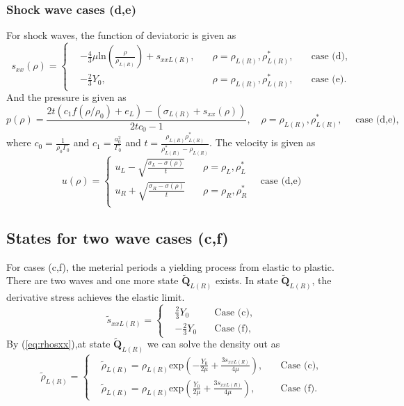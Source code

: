 \documentclass[review]{elsarticle}
\begin{document}
\subsubsection{Shock wave cases (d,e)}
For shock waves, the function of deviatoric is given as 
\begin{equation}
  s_{xx}(\rho) = \left\{\begin{aligned}
	  & -\frac{4}{3}\mu\text{ln}\left(\frac{\rho}{\rho_{L(R)}}\right)+s_{xxL(R)},\quad   &\rho =\rho_{L(R)},\rho_{L(R)}^*,
	\quad  &\text{case (d)},\\
	& -\frac{2}{3}Y_0,   \quad & \rho =\rho_{L(R)},\rho_{L(R)}^*, \quad
 &\text{case (e)}.
  \end{aligned} \right.
  \end{equation}
And the pressure is given as
\begin{equation}
  p(\rho)= 
  \frac{2t(c_1f(\rho/\rho_0)+e_L)-(\sigma_{L(R)}+s_{xx}(\rho))}{2tc_0-1}, \quad  \rho=\rho_{L(R)},\rho_{L(R)}^*, \quad 
  \text{ case (d,e)},
\end{equation}
where $c_0 = \frac{1}{\rho_0\Gamma_0}$ and $c_1 = \frac{a_0^2}{\Gamma_0}$ and $ t=\frac{\rho_{L(R)} \rho_{L(R)}^*}{\rho_{L(R)}^*-\rho_{L(R)}}$. 
The velocity is given as
\begin{equation}
  u(\rho) = \left\{ \begin{aligned}
	  u_L -\sqrt{\frac{\sigma_L-\sigma(\rho)}{t}} \quad &\rho =\rho_L, \rho_L^*\\ 
	  u_R +\sqrt{\frac{\sigma_R-\sigma(\rho)}{t}} \quad & \rho =\rho_R, \rho_R^*\\
  \end{aligned}
\right. \quad \text{case (d,e)}
\end{equation}

\subsection{States for two wave cases (c,f)}\label{sec:two}

For cases (c,f), the meterial periods a yielding process from elastic to plastic. There are two waves and  one more state $\tilde{\mathbf{Q}}_{L(R)}$ exists. In state $\tilde{\mathbf{Q}}_{L(R)}$, the derivative stress achieves the elastic limit. 
\begin{equation}
 \tilde{s}_{xxL(R)} = \left\{ \begin{aligned}
	 &\frac{2}{3}Y_0 \quad  &\text{Case (c)},\\
	 &-\frac{2}{3}Y_0 \quad &\text{Case (f)},
	\end{aligned}
  \right.
\end{equation}
By (\ref{eq:rhosxx}),at state $\tilde{\mathbf{Q}}_{L(R)}$ we can solve the density out as 
\begin{equation}
  \tilde{\rho}_{L(R)}= \left\{ \begin{aligned}
	  &\widetilde{\rho}_{L(R)} = \rho_{L(R)} \text{exp}\left(-\frac{Y_0}{2\mu}+\frac{3 s_{xxL(R)}}{4\mu}\right), \quad  & \text{Case (c)}, \\ 
	  &\widetilde{\rho}_{L(R)} = \rho_{L(R)} \text{exp}\left(\frac{Y_0}{2\mu}+\frac{3 s_{xxL(R)}}{4\mu}\right), \quad  & \text{Case (f)}. 
	\end{aligned}
  \right.
	\end{equation}
\end{document}
